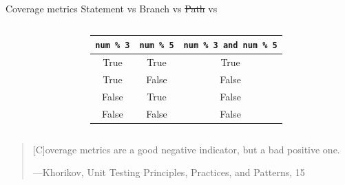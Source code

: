\documentclass[english,10pt,aspectratio=169]{beamer}
\begin{document}
\begin{frame}{Coverage metrics}
  Statement vs Branch vs \sout{Path} vs 
  \begin{columns}[T]
    \begin{column}[]{0.5\textwidth}
      \begin{minipage}{\linewidth}
        \coveragecode
      \end{minipage}
    \end{column}
    \begin{column}[]{0.5\textwidth}
      \begin{center}
        \begin{tabular}{ ccc }
          \hline
          \texttt{num \% 3} & \texttt{num \% 5} & \texttt{num \% 3 and num \% 5} \\
          \hline
          True & True & True \\
          True & False & False \\
          False & True & False \\
          False & False & False \\
          \hline
        \end{tabular}
      \end{center}
    \end{column}
  \end{columns}
\end{frame}

\begin{frame}
  \begin{quote}
    [C]overage metrics are a good negative indicator, but a bad positive one.
    \begin{flushright}
      \tiny{---Khorikov, \textup{Unit Testing Principles, Practices, and Patterns}, 15}
    \end{flushright}
  \end{quote}
\end{frame}
\end{document}
